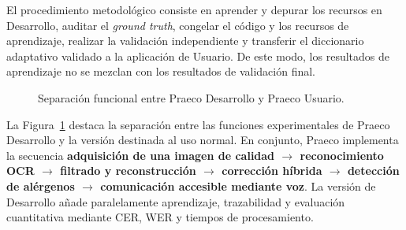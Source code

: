 El procedimiento metodológico consiste en aprender y depurar los recursos en Desarrollo, auditar el \textit{ground truth}, congelar el código y los recursos de aprendizaje, realizar la validación independiente y transferir el diccionario adaptativo validado a la aplicación de Usuario. De este modo, los resultados de aprendizaje no se mezclan con los resultados de validación final.

\begin{figure}[htbp]
	\centering
	\caption{Separación funcional entre Praeco Desarrollo y Praeco Usuario.}
	\label{fig:desarrollo-usuario}
\end{figure}

La Figura~\ref{fig:desarrollo-usuario} destaca la separación entre las funciones experimentales de Praeco Desarrollo y la versión destinada al uso normal. En conjunto, Praeco implementa la secuencia \textbf{adquisición de una imagen de calidad $\rightarrow$ reconocimiento OCR $\rightarrow$ filtrado y reconstrucción $\rightarrow$ corrección híbrida $\rightarrow$ detección de alérgenos $\rightarrow$ comunicación accesible mediante voz}. La versión de Desarrollo añade paralelamente aprendizaje, trazabilidad y evaluación cuantitativa mediante CER, WER y tiempos de procesamiento.



